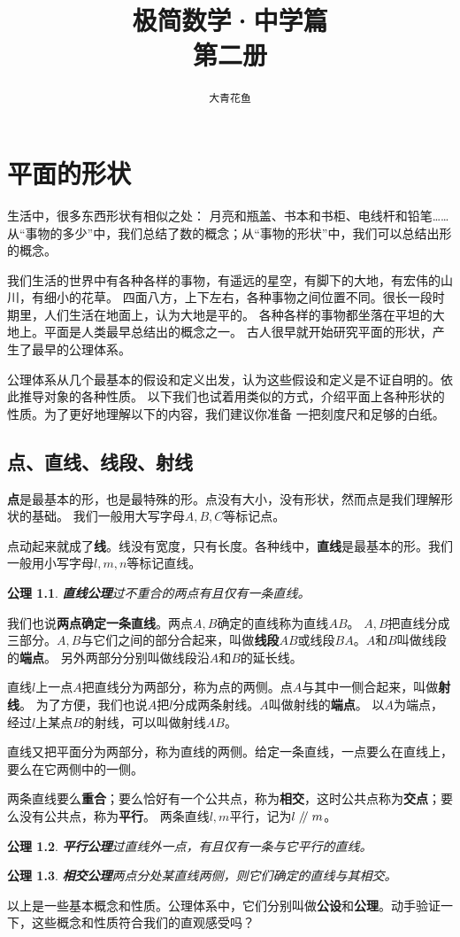 \documentclass[12pt,UTF8]{ctexbook}
\title{\zihao{0} \bfseries 极简数学·中学篇 \\ 第二册}
\author{\zihao{2} \texttt{大青花鱼}}
\date{}
\newtheorem{po}{公理}
\renewcommand\parallel{\mathrel{/\mskip-4mu/}}
\begin{document}
\maketitle
\tableofcontents
\newpage

\chapter{平面的形状}

生活中，很多东西形状有相似之处：
月亮和瓶盖、书本和书柜、电线杆和铅笔……
从“事物的多少”中，我们总结了数的概念；从“事物的形状”中，我们可以总结出形的概念。

我们生活的世界中有各种各样的事物，有遥远的星空，有脚下的大地，有宏伟的山川，有细小的花草。
四面八方，上下左右，各种事物之间位置不同。很长一段时期里，人们生活在地面上，认为大地是平的。
各种各样的事物都坐落在平坦的大地上。平面是人类最早总结出的概念之一。
古人很早就开始研究平面的形状，产生了最早的公理体系。

公理体系从几个最基本的假设和定义出发，认为这些假设和定义是不证自明的。依此推导对象的各种性质。
以下我们也试着用类似的方式，介绍平面上各种形状的性质。为了更好地理解以下的内容，我们建议你准备
一把刻度尺和足够的白纸。

\section{点、直线、线段、射线}
\textbf{点}是最基本的形，也是最特殊的形。点没有大小，没有形状，然而点是我们理解形状的基础。
我们一般用大写字母$A,B,C$等标记点。

点动起来就成了\textbf{线}。线没有宽度，只有长度。各种线中，\textbf{直线}是最基本的形。我们一般用小写字母$l,m,n$等标记直线。
\begin{po}{\textbf{直线公理}}\label{po:0}
    过不重合的两点有且仅有一条直线。
\end{po}
我们也说\textbf{两点确定一条直线}。两点$A,B$确定的直线称为直线$AB$。
$A,B$把直线分成三部分。$A,B$与它们之间的部分合起来，叫做\textbf{线段}$AB$或线段$BA$。$A$和$B$叫做线段的\textbf{端点}。
另外两部分分别叫做线段沿$A$和$B$的延长线。

直线$l$上一点$A$把直线分为两部分，称为点的两侧。点$A$与其中一侧合起来，叫做\textbf{射线}。
为了方便，我们也说$A$把$l$分成两条射线。$A$叫做射线的\textbf{端点}。
以$A$为端点，经过$l$上某点$B$的射线，可以叫做射线$AB$。

直线又把平面分为两部分，称为直线的两侧。给定一条直线，一点要么在直线上，要么在它两侧中的一侧。

两条直线要么\textbf{重合}；要么恰好有一个公共点，称为\textbf{相交}，这时公共点称为\textbf{交点}；要么没有公共点，称为\textbf{平行}。
两条直线$l,m$平行，记为$l \parallel m$。
\begin{po}{\textbf{平行公理}}\label{po:1}
    过直线外一点，有且仅有一条与它平行的直线。
\end{po}
\begin{po}{\textbf{相交公理}}\label{po:2}
    两点分处某直线两侧，则它们确定的直线与其相交。
\end{po}
以上是一些基本概念和性质。公理体系中，它们分别叫做\textbf{公设}和\textbf{公理}。动手验证一下，这些概念和性质符合我们的直观感受吗？
\end{document}
